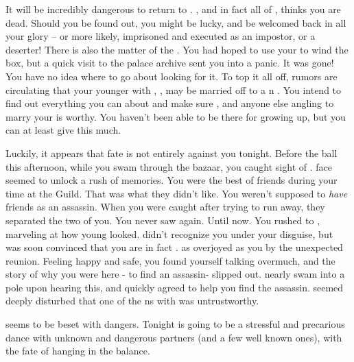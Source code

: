 \documentclass[char]{NeptuneBall}
\begin{document}
It will be incredibly dangerous to return to \pAtlantis{}. \cKing{}, and in fact all of \pAtlantis{}, thinks you are dead. Should you be found out, you might be lucky, and be welcomed back in all your glory -- or more likely, imprisoned and executed as an impostor, or a deserter! There is also the matter of the \iMusicBox{\MYname}. You had hoped to use your \iMusicBoxKey{} to wind the box, but a quick visit to the palace archive sent you into a panic. It was gone! You have no idea where to go about looking for it. To top it all off, rumors are circulating that your younger \cPrincess{\offspring} with \cKing{}, \cPrincess{}, may be married off to a \pPacifica{}n \cPrince{\prince}. You intend to find out everything you can about \cPrince{\them} and make sure \cPrince{\they}, and anyone else angling to marry your \cPrincess{\offspring} is worthy. You haven't been able to be there for \cPrincess{} growing up, but you can at least give \cPrincess{\them} this much.

Luckily, it appears that fate is not entirely against you tonight. Before the ball this afternoon, while you swam through the bazaar, you caught sight of \cDiplomat{}. \cDiplomat{\Their} face seemed to unlock a rush of memories. You were the best of friends during your time at the Guild.  That was what they didn't like. You weren't supposed to \emph{have} friends as an assassin.  When you were caught after trying to run away, they separated the two of you. You never saw \cDiplomat{\them} again. Until now. You rushed to \cDiplomat{\them}, marveling at how young \cDiplomat{\they} looked. \cDiplomat{} didn't recognize you under your disguise, but was soon convinced that you are in fact \cQueen{}. \cDiplomat{\They} \cDiplomat{\were} as overjoyed as you by the unexpected reunion. Feeling happy and safe, you found yourself talking overmuch, and the story of why you were here - to find an assassin- slipped out. \cDiplomat{} nearly swam into a pole upon hearing this, and quickly agreed to help you find the assassin. \cDiplomat{\They} seemed deeply disturbed that one of the \pPacifica{}ns with \cDiplomat{\them} was untrustworthy.

\pAtlantis{} seems to be beset with dangers. Tonight is going to be a stressful and precarious dance with unknown and dangerous partners (and a few well known ones), with the fate of \pAtlantis{} hanging in the balance.
\end{document}
